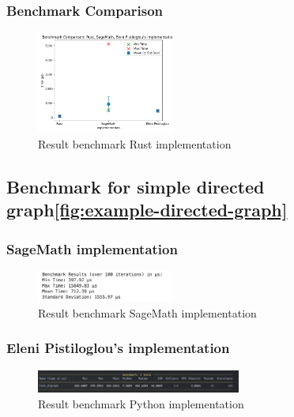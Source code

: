 \subsubsection*{Benchmark Comparison}
\begin{figure}[!h]
    \centering
    \includegraphics[width=0.40\textwidth]{images/benchmark/graph_wikipedia/benchmark_comparison_graph_wikipedia}
    \caption{Result benchmark Rust implementation}
    \label{fig:benchmark-comparison-graph-wikipedia}
\end{figure}

\newpage

\subsection{Benchmark for simple directed graph\ref{fig:example-directed-graph}}\label{subsec:benchmark-for-simple-directed-graph}

\subsubsection*{SageMath implementation}
\begin{figure}[!h]
    \centering
    \includegraphics[width=0.40\textwidth]{images/benchmark/digraph/benchmark_digraph_sagemath}
    \caption{Result benchmark SageMath implementation}
    \label{fig:benchmark-digraph-sagemath}
\end{figure}

\subsubsection*{Eleni Pistiloglou's implementation}
\begin{figure}[!h]
    \centering
    \includegraphics[width=0.60\textwidth]{images/benchmark/digraph/benchmark_digraph_python}
    \caption{Result benchmark Python implementation}
    \label{fig:benchmark-digraph-python}
\end{figure}


